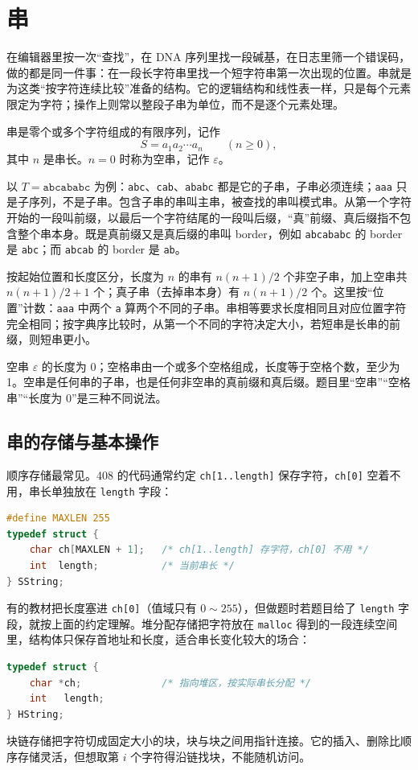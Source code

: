 \section{串}

在编辑器里按一次“查找”，在 DNA 序列里找一段碱基，在日志里筛一个错误码，做的都是同一件事：在一段长字符串里找一个短字符串第一次出现的位置。串就是为这类“按字符连续比较”准备的结构。它的逻辑结构和线性表一样，只是每个元素限定为字符；操作上则常以整段子串为单位，而不是逐个元素处理。

串是零个或多个字符组成的有限序列，记作
\[
S=a_1a_2\cdots a_n\qquad(n\ge 0),
\]
其中 $n$ 是串长。$n=0$ 时称为空串，记作 $\varepsilon$。

以 $T=\texttt{abcababc}$ 为例：\texttt{abc}、\texttt{cab}、\texttt{ababc} 都是它的子串，子串必须连续；\texttt{aaa} 只是子序列，不是子串。包含子串的串叫主串，被查找的串叫模式串。从第一个字符开始的一段叫前缀，以最后一个字符结尾的一段叫后缀，“真”前缀、真后缀指不包含整个串本身。既是真前缀又是真后缀的串叫 border，例如 \texttt{abcababc} 的 border 是 \texttt{abc}；而 \texttt{abcab} 的 border 是 \texttt{ab}。

按起始位置和长度区分，长度为 $n$ 的串有 $n(n+1)/2$ 个非空子串，加上空串共 $n(n+1)/2+1$ 个；真子串（去掉串本身）有 $n(n+1)/2$ 个。这里按“位置”计数：\texttt{aaa} 中两个 \texttt{a} 算两个不同的子串。串相等要求长度相同且对应位置字符完全相同；按字典序比较时，从第一个不同的字符决定大小，若短串是长串的前缀，则短串更小。

\begin{attention}
空串 $\varepsilon$ 的长度为 0；空格串由一个或多个空格组成，长度等于空格个数，至少为 1。空串是任何串的子串，也是任何非空串的真前缀和真后缀。题目里“空串”“空格串”“长度为 0”是三种不同说法。
\end{attention}

\subsection{串的存储与基本操作}

顺序存储最常见。408 的代码通常约定 \texttt{ch[1..length]} 保存字符，\texttt{ch[0]} 空着不用，串长单独放在 \texttt{length} 字段：
\begin{lstlisting}[language=C]
#define MAXLEN 255
typedef struct {
    char ch[MAXLEN + 1];   /* ch[1..length] 存字符，ch[0] 不用 */
    int  length;           /* 当前串长 */
} SString;
\end{lstlisting}
有的教材把长度塞进 \texttt{ch[0]}（值域只有 $0\sim255$），但做题时若题目给了 \texttt{length} 字段，就按上面的约定理解。堆分配存储把字符放在 \texttt{malloc} 得到的一段连续空间里，结构体只保存首地址和长度，适合串长变化较大的场合：
\begin{lstlisting}[language=C]
typedef struct {
    char *ch;              /* 指向堆区，按实际串长分配 */
    int   length;
} HString;
\end{lstlisting}
块链存储把字符切成固定大小的块，块与块之间用指针连接。它的插入、删除比顺序存储灵活，但想取第 $i$ 个字符得沿链找块，不能随机访问。


